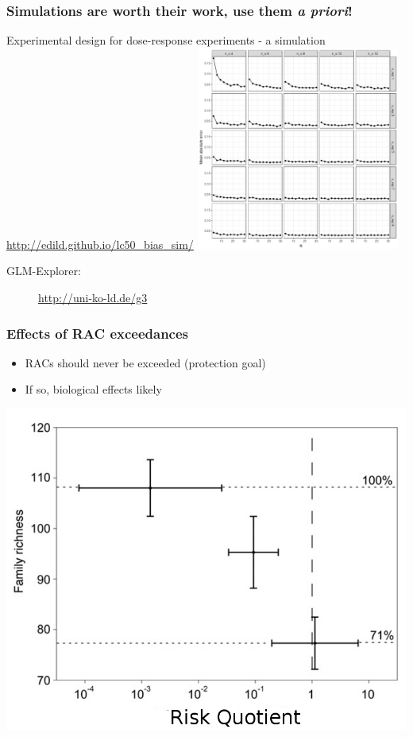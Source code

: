 \documentclass[
	10pt
	]{beamer}
\begin{document}
\begin{frame}
\frametitle{Simulations are worth their work, use them \emph{a priori}!}
	Experimental design for dose-response experiments - a simulation \\
	\url{http://edild.github.io/lc50_bias_sim/}
		    	\includegraphics[width=0.5\textwidth, keepaspectratio]{figs/sim_drm.png} \\
	\begin{description}
		\item[GLM-Explorer:]{\url{http://uni-ko-ld.de/g3}}
	\end{description}
\end{frame}


{%
\begin{frame}
\frametitle{Effects of RAC exceedances}
			\begin{itemize}
				\item RACs should never be exceeded (protection goal)
				\item If so, biological effects likely
			\end{itemize}
	    	    	\includegraphics[height=0.7\textheight]{figs/stehle_pnas_2015_mod.png}
\end{frame}
}
\end{document}
